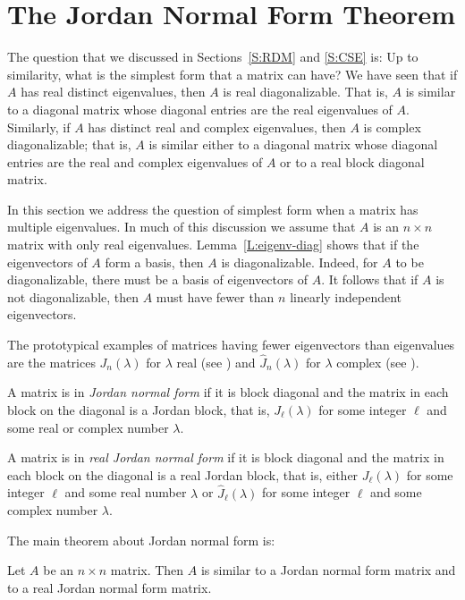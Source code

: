 \documentclass{ximera}
\begin{document}
\section{The Jordan Normal Form Theorem}
\label{S:JNF}

The question that we discussed in Sections~\ref{S:RDM} and \ref{S:CSE} is: 
Up to similarity, what is the simplest form that a matrix can have?  
We have seen that if $A$ has real distinct eigenvalues, then $A$ is real 
diagonalizable.  That is, $A$ is similar to a diagonal matrix whose 
diagonal entries are the real eigenvalues of $A$.  Similarly, if $A$ has 
distinct real and complex eigenvalues, then $A$ is complex diagonalizable; 
that is, $A$ is similar either to a diagonal matrix whose diagonal entries 
are the real and complex eigenvalues of $A$ or to a real block diagonal 
matrix.

In this section we address the question of simplest form when a
matrix has multiple eigenvalues.  In much of this discussion we assume
that $A$ is an $n\times n$ matrix with only real eigenvalues.  
Lemma~\ref{L:eigenv-diag} shows that if the eigenvectors of 
$A$ form a basis, then $A$ is diagonalizable. Indeed, for $A$ to be
diagonalizable, there must be a basis of eigenvectors of $A$.  It 
follows that if $A$ is not diagonalizable, then $A$ must have fewer
than $n$ linearly independent 
eigenvectors.  

The prototypical examples of matrices having fewer eigenvectors than 
eigenvalues are the matrices $J_n(\lambda)$ for $\lambda$ real (see
) and $\widehat{J}_n(\lambda)$ for $\lambda$ complex (see
).
\begin{Def} 
A matrix is in {\em Jordan normal form\/} if it is block diagonal and 
the matrix in each block on the diagonal is a Jordan block, that is, 
$J_\ell(\lambda)$ for some integer $\ell$ and some real or complex number 
$\lambda$.  

A matrix is in {\em real Jordan normal form\/} if it is block diagonal 
and the matrix in each block on the diagonal is a real Jordan block, that is, 
either $J_\ell(\lambda)$ for some integer $\ell$ and some real number 
$\lambda$ or $\widehat{J}_\ell(\lambda)$ for some integer $\ell$ and some 
complex number $\lambda$. 
\end{Def} 


The main theorem about Jordan normal form is:
\begin{thm} \label{T:Jordan}
Let $A$ be an $n\times n$ matrix.  Then $A$ is 
similar to a Jordan normal
form matrix and to a real Jordan normal form matrix.
\end{thm}
\end{document}
